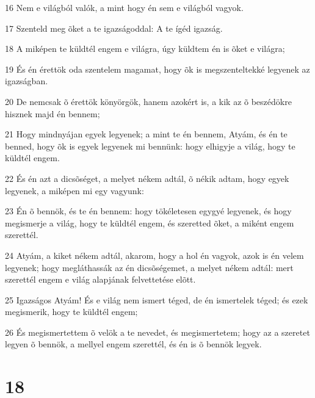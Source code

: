 \par 16 Nem e világból valók, a mint hogy én sem e világból vagyok.
\par 17 Szenteld meg õket a te igazságoddal: A te ígéd igazság.
\par 18 A miképen te küldtél engem e világra, úgy küldtem én is õket e világra;
\par 19 És én érettök oda szentelem magamat, hogy õk is megszenteltekké legyenek az igazságban.
\par 20 De nemcsak õ érettök könyörgök, hanem azokért is, a kik az õ beszédökre hisznek majd én bennem;
\par 21 Hogy mindnyájan egyek legyenek; a mint te én bennem, Atyám, és én te benned, hogy õk is egyek legyenek mi  bennünk: hogy elhigyje a világ, hogy te küldtél engem.
\par 22 És én azt a dicsõséget, a melyet nékem adtál, õ nékik adtam, hogy egyek legyenek, a miképen mi egy vagyunk:
\par 23 Én õ bennök, és te én bennem: hogy tökéletesen egygyé legyenek, és hogy megismerje a világ, hogy te küldtél engem, és szeretted õket, a miként engem szerettél.
\par 24 Atyám, a kiket nékem adtál, akarom, hogy a hol én vagyok, azok is én velem legyenek; hogy megláthassák az én dicsõségemet, a melyet nékem adtál: mert szerettél engem e világ alapjának felvettetése elõtt.
\par 25 Igazságos Atyám! És e világ nem ismert téged, de én ismertelek téged; és ezek megismerik, hogy te küldtél engem;
\par 26 És megismertettem õ velök a te nevedet, és megismertetem; hogy az a szeretet legyen õ bennök, a mellyel engem szerettél, és én is õ bennök legyek.

\chapter{18}

